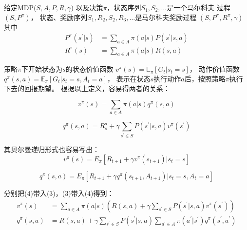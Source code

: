 \documentclass[UTF8]{ctexart}
\begin{document}
给定MDP($S, A, P, R, \gamma$) 以及决策$\pi$，状态序列$S_1, S_2, \ldots $是一个马尔科夫
过程$(S, P^{\pi})$， 状态、奖励序列$S_1, R_2, S_2, R_3, \ldots$是马尔科夫奖励过程
$(S, P^{\pi}, R^{\pi}, \gamma)$
其中
$$\begin{aligned}
    P^{\pi}\left(s^{\prime} | s\right) &=\sum_{a \in A} \pi(a | s) P\left(s^{\prime} | s, a\right) \\
    R^{\pi}(s) &=\sum_{a \in A} \pi(a | s) R(s, a)
    \end{aligned}
$$


策略$\pi$下开始状态为$s$的状态价值函数
$v^{\pi}(s)=\mathbb{E}_{\pi}\left[G_{t} | s_{t}=s\right]$，
动作价值函数
$q^{\pi}(s, a)=\mathbb{E}_{\pi}\left[G_{t} | s_{t}=s, A_{t}=a\right]$，
表示在状态$s$执行动作$a$后，按照策略$\pi$执行下去的回报期望。
根据以上定义，容易得两者的关系：

\begin{equation}
   v^{\pi}(s)=\sum_{a \in A} \pi(a | s) q^{\pi}(s, a)
\end{equation}

\begin{equation}\label{qsav}
    q^{\pi}(s, a)=R_{s}^{a}+\gamma \sum_{s^{\prime} \in S} P\left(s^{\prime} | s, a\right) v^{\pi}\left(s^{\prime}\right)
\end{equation}


其贝尔曼递归形式也容易写出：
\begin{equation}
v^{\pi}(s)=E_{\pi}\left[R_{t+1}+\gamma v^{\pi}\left(s_{t+1}\right) | s_{t}=s\right]
\end{equation}

\begin{equation}
q^{\pi}(s, a)=E_{\pi}\left[R_{t+1}+\gamma q^{\pi}\left(s_{t+1}, A_{t+1}\right) | s_{t}=s, A_{t}=a\right]
\end{equation}

分别把(4)带入(3)，(3)带入(4)得到：
\begin{equation}
    \begin{aligned}
        v^{\pi}(s) &=\sum_{a \in A} \pi(a | s)\left(R(s, a)+\gamma \sum_{s^{\prime} \in S} P\left(s^{\prime} | s, a\right) v^{\pi}\left(s^{\prime}\right)\right)   \\
        q^{\pi}(s, a) &=R(s, a)+\gamma \sum_{s^{\prime} \in S} P\left(s^{\prime} | s, a\right) \sum_{a^{\prime} \in A} \pi\left(a^{\prime} | s^{\prime}\right) 
        q^{\pi}\left(s^{\prime}, a^{\prime}\right) 
    \end{aligned}
\end{equation}
\end{document}
